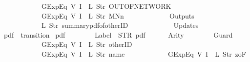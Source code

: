 \begin{isabellebody}
\ \ \ \ \ \ \ \ \ \ \ \ GExp{\isachardot}Eq\ {\isacharparenleft}V\ {\isacharparenleft}I\ {}{\isacharparenright}{\isacharparenright}\ {\isacharparenleft}L\ {\isacharparenleft}Str\ {\isacharprime}{\isacharprime}OUT{\isacharunderscore}OF{\isacharunderscore}NETWORK{\isacharprime}{\isacharprime}{\isacharparenright}{\isacharparenright}{\isacharcomma}\isanewline
\ \ \ \ \ \ \ \ \ \ \ \ GExp{\isachardot}Eq\ {\isacharparenleft}V\ {\isacharparenleft}I\ {}{\isacharparenright}{\isacharparenright}\ {\isacharparenleft}L\ {\isacharparenleft}Str\ {\isacharprime}{\isacharprime}MNn{}{\isacharprime}{\isacharprime}{\isacharparenright}{\isacharparenright}\isanewline
\ \ \ \ \ \ {\isacharbrackright}{\isacharcomma}\isanewline
\ \ \ \ \ \ Outputs\ {\isacharequal}\ {\isacharbrackleft}\isanewline
\ \ \ \ \ \ \ \ \ \ \ \ {\isacharparenleft}L\ {\isacharparenleft}Str\ {\isacharprime}{\isacharprime}summary{\isacharunderscore}pdf{\isacharunderscore}of{\isacharunderscore}otherID{\isacharprime}{\isacharprime}{\isacharparenright}{\isacharparenright}\isanewline
\ \ \ \ \ \ {\isacharbrackright}{\isacharcomma}\isanewline
\ \ \ \ \ \ Updates\ {\isacharequal}\ {\isacharbrackleft}{\isacharbrackright}\isanewline
{\isasymrparr}{\isachardoublequoteclose}\isanewline
\isanewline
{}\isamarkupfalse%
\ {\isachardoublequoteopen}pdf{}{\isachardoublequoteclose}\ {\isacharcolon}{\isacharcolon}\ {\isachardoublequoteopen}transition{\isachardoublequoteclose}\ \isanewline
{\isachardoublequoteopen}pdf{}\ {\isasymequiv}\ {\isasymlparr}\isanewline
\ \ \ \ \ \ Label\ {\isacharequal}\ STR\ {\isacharprime}{\isacharprime}pdf{\isacharprime}{\isacharprime}{\isacharcomma}\isanewline
\ \ \ \ \ \ Arity\ {\isacharequal}\ {}{\isacharcomma}\isanewline
\ \ \ \ \ \ Guard\ {\isacharequal}\ {\isacharbrackleft}\isanewline
\ \ \ \ \ \ \ \ \ \ \ \ GExp{\isachardot}Eq\ {\isacharparenleft}V\ {\isacharparenleft}I\ {}{\isacharparenright}{\isacharparenright}\ {\isacharparenleft}L\ {\isacharparenleft}Str\ {\isacharprime}{\isacharprime}otherID{\isacharprime}{\isacharprime}{\isacharparenright}{\isacharparenright}{\isacharcomma}\isanewline
\ \ \ \ \ \ \ \ \ \ \ \ GExp{\isachardot}Eq\ {\isacharparenleft}V\ {\isacharparenleft}I\ {}{\isacharparenright}{\isacharparenright}\ {\isacharparenleft}L\ {\isacharparenleft}Str\ {\isacharprime}{\isacharprime}name{\isacharprime}{\isacharprime}{\isacharparenright}{\isacharparenright}{\isacharcomma}\isanewline
\ \ \ \ \ \ \ \ \ \ \ \ GExp{\isachardot}Eq\ {\isacharparenleft}V\ {\isacharparenleft}I\ {}{\isacharparenright}{\isacharparenright}\ {\isacharparenleft}L\ {\isacharparenleft}Str\ {\isacharprime}{\isacharprime}{}zoF{\isacharprime}{\isacharprime}{\isacharparenright}{\isacharparenright}\isanewline

\end{isabellebody}
